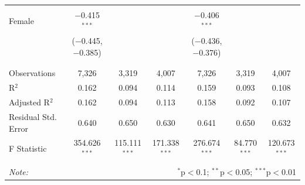 \documentclass[12pt,a4paper]{article}
\numberwithin{equation}{section}
\begin{document}
\begin{landscape}
\begin{table}[!htbp]
\begin{tabular}{@{\extracolsep{5pt}}lcccccc}
			& & & & & & \\ 
			Female & $-$0.415$^{***}$ &  &  & $-$0.406$^{***}$ &  &  \\ 
			& ($-$0.445, $-$0.385) &  &  & ($-$0.436, $-$0.376) &  &  \\ 
			& & & & & & \\ 
			\hline \\[-1.8ex] 
			Observations & 7,326 & 3,319 & 4,007 & 7,326 & 3,319 & 4,007 \\ 
			R$^{2}$ & 0.162 & 0.094 & 0.114 & 0.159 & 0.093 & 0.108 \\ 
			Adjusted R$^{2}$ & 0.162 & 0.094 & 0.113 & 0.158 & 0.092 & 0.107 \\ 
			Residual Std. Error & 0.640 & 0.650 & 0.630 & 0.641 & 0.650 & 0.632 \\ 
			F Statistic & 354.626$^{***}$ & 115.111$^{***}$ & 171.338$^{***}$ & 276.674$^{***}$ & 84.770$^{***}$ & 120.673$^{***}$ \\ 
			\hline 
			\hline \\[-1.8ex] 
			\textit{Note:}  & \multicolumn{6}{r}{$^{*}$p$<$0.1; $^{**}$p$<$0.05; $^{***}$p$<$0.01} \\ 
		\end{tabular} 
	\end{table} 
	
\end{landscape}

\newpage
\end{document}
